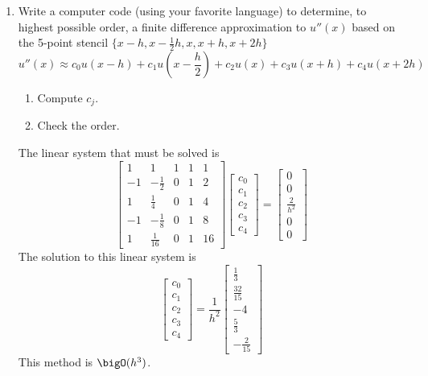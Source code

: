 \documentclass{article}
\newcommand\NoIndent[1]{%
  \begingroup
  \par
  \parshape0
  #1\par
  \endgroup
}
\begin{document}
\begin{enumerate}
	\item Write a computer code (using your favorite language) to determine, to highest possible order,
		a finite difference approximation to $u''(x)$ based on the 5-point stencil
		$\{x-h,x-\frac{1}{2}h,x,x+h,x+2h\}$
		\begin{equation*}
			u''(x) \approx
				c_0 u(x-h) + c_1 u\left(x-\frac{h}{2}\right) + c_2 u(x) + c_3 u(x+h) + c_4 u(x+2h)
		\end{equation*}
		\begin{enumerate}
			\item Compute $c_j$.
			\item Check the order.
		\end{enumerate}

\NoIndent{
	The linear system that must be solved is
	\begin{equation*}
		\begin{bmatrix}
			 1 & 1 & 1 & 1 & 1 \\
			 -1 & -\frac{1}{2} & 0 & 1 & 2 \\
			 1 & \frac{1}{4} & 0 & 1 & 4 \\
			 -1 & -\frac{1}{8} & 0 & 1 & 8 \\
			 1 & \frac{1}{16} & 0 & 1 & 16
		\end{bmatrix}
		\begin{bmatrix}
			c_0 \\
			c_1 \\
			c_2 \\
			c_3 \\
			c_4
		\end{bmatrix} =
		\begin{bmatrix}
			0 \\
			0 \\
			\frac{2}{h^2} \\
			0 \\
			0
		\end{bmatrix}
	\end{equation*}
	The solution to this linear system is
	\begin{equation*}
		\begin{bmatrix}
			c_0 \\
			c_1 \\
			c_2 \\
			c_3 \\
			c_4
		\end{bmatrix} = \frac{1}{h^2}
		\begin{bmatrix}
			\frac{1}{3} \\
			\frac{32}{15} \\
			-4 \\
			\frac{5}{3} \\
			-\frac{2}{15}
		\end{bmatrix}
	\end{equation*}
	This method is $\bigO(h^3)$.
}


\end{enumerate}
\end{document}
